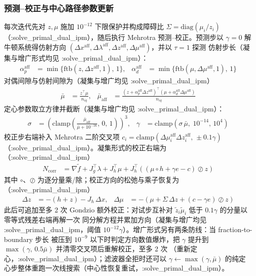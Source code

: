 \subsubsection*{预测--校正与中心路径参数更新}
每次迭代先对 $z,\mu$ 施加 $10^{-12}$ 下限保护并构成障碍比
$\Sigma=\mathrm{diag}(\mu_i/z_i)$（:solve\_primal\_dual\_ipm），随后执行
Mehrotra 预测--校正。预测步以 $\gamma=0$ 解牛顿系统得仿射方向
$(\Delta x^{\mathrm{aff}},\Delta\lambda^{\mathrm{aff}},
\Delta z^{\mathrm{aff}},\Delta\mu^{\mathrm{aff}})$，并以 $\tau=1$ 探测
仿射步长（凝集与增广形式均见 :solve\_primal\_dual\_ipm）：
\begin{align*}
\alpha_p^{\mathrm{aff}} &= \min\{\mathrm{ftb}(z,\Delta z^{\mathrm{aff}},1),\,1\},
&
\alpha_d^{\mathrm{aff}} &= \min\{\mathrm{ftb}(\mu,\Delta\mu^{\mathrm{aff}},1),\,1\}
\end{align*}
对偶间隙与仿射间隙为（凝集与增广均见 :solve\_primal\_dual\_ipm）
\begin{align*}
\bar\mu &= \frac{z^{\top}\mu}{n_{iq}},
&
\bar\mu_{\mathrm{aff}} &=
\frac{(z+\alpha_p^{\mathrm{aff}}\Delta z^{\mathrm{aff}})^{\top}
      (\mu+\alpha_d^{\mathrm{aff}}\Delta\mu^{\mathrm{aff}})}{n_{iq}}
\end{align*}
定心参数取立方律并截断（凝集与增广均见 :solve\_primal\_dual\_ipm）：
\begin{align*}
\sigma &= \left(\mathrm{clamp}\!\left(
  \frac{\bar\mu_{\mathrm{aff}}}{\bar\mu+10^{-16}},\,0,\,1\right)\right)^{3},
&
\gamma &= \mathrm{clamp}\!\left(\sigma\,\bar\mu,\;10^{-14},\,10^{4}\right)
\end{align*}
校正步右端补入 Mehrotra 二阶交叉项
$c_i=\mathrm{clamp}(\Delta\mu_i^{\mathrm{aff}}\Delta z_i^{\mathrm{aff}},
\,\pm 0.1\gamma)$（:solve\_primal\_dual\_ipm）。凝集形式的校正右端为
（:solve\_primal\_dual\_ipm）
\begin{align*}
N_{\mathrm{corr}} &= \nabla\tilde f + J_g^{\top}\lambda + J_h^{\top}\mu
+ J_h^{\top}\!\left((\mu\circ h + \gamma e - c)\oslash z\right)
\end{align*}
其中 $\circ$、$\oslash$ 为逐分量乘/除；校正方向的松弛与乘子恢复为
（:solve\_primal\_dual\_ipm）
\begin{align*}
\Delta z &= -(h+z) - J_h\,\Delta x,
&
\Delta\mu &= -\left(\mu + \Sigma\,\Delta z + (c-\gamma e)\oslash z\right)
\end{align*}
此后可追加至多 2 次 Gondzio 额外校正：对试步互补对
$\tilde z_i\tilde\mu_i$ 低于 $0.1\gamma$ 的分量以零等式残差右端再解一次
同分解方程并累加方向（凝集与增广均见 :solve\_primal\_dual\_ipm，阈值
$10^{-12}\gamma$）。增广形式另有两条防线：当 fraction-to-boundary 步长
被压到 $10^{-9}$ 以下时判定方向数值爆炸，把 $\gamma$ 提升到
$\max(\gamma,\,0.5\bar\mu)$ 并清零交叉项后重解校正，至多 2 次
（重新定心，:solve\_primal\_dual\_ipm）；滤波器全拒时还可以 $\gamma\leftarrow\max(\gamma,\bar\mu)$
的纯定心步整体重跑一次线搜索（中心性恢复重试，:solve\_primal\_dual\_ipm）。


